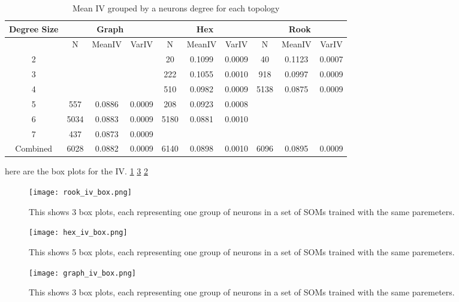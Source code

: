 \begin{table}
\caption{Mean IV grouped by a neurons degree for each topology}
\label{meanvar1}
\begin{tabular}{|c||c|c|c||c|c|c||c|c|c|}
\hline
\textbf{Degree Size} & \multicolumn{3}{c||}{\textbf{Graph}} &
\multicolumn{3}{c||}{\textbf{Hex}} & \multicolumn{3}{c|}{\textbf{Rook}} \\
\hline
& N & MeanIV & VarIV & N & MeanIV & VarIV & N & MeanIV & VarIV \\
\hline
2&&&& 20& 0.1099& 0.0009& 40& 0.1123& 0.0007\\ 
3&&&& 222& 0.1055& 0.0010& 918& 0.0997& 0.0009\\ 
4&&&& 510& 0.0982& 0.0009& 5138& 0.0875& 0.0009\\ 
5& 557& 0.0886& 0.0009& 208& 0.0923& 0.0008&&&\\ 
6& 5034& 0.0883& 0.0009& 5180& 0.0881& 0.0010&&&\\ 
7& 437& 0.0873& 0.0009&&&&&&\\ 
\hline 
Combined& 6028& 0.0882& 0.0009& 6140& 0.0898& 0.0010& 6096& 0.0895& 0.0009\\ 
\hline
\end{tabular} \end{table}




here are the box plots for the IV. \ref{fRookIV} \ref{fGraphIV} \ref{fHexIV}


\begin{figure}
\centering
\texttt{[image: rook\_iv\_box.png]}
\caption{This shows 3 box plots, each representing one group of neurons in a set
of SOMs trained with the same paremeters.}
\label{fRookIV}
\end{figure}

\begin{figure}
\centering
\texttt{[image: hex\_iv\_box.png]}
\caption{This shows 5 box plots, each representing one group of neurons in a set
of SOMs trained with the same paremeters.}
\label{fHexIV}
\end{figure}

\begin{figure}
\centering
\texttt{[image: graph\_iv\_box.png]}
\caption{This shows 3 box plots, each representing one group of neurons in a set
of SOMs trained with the same paremeters.}
\label{fGraphIV}
\end{figure}





